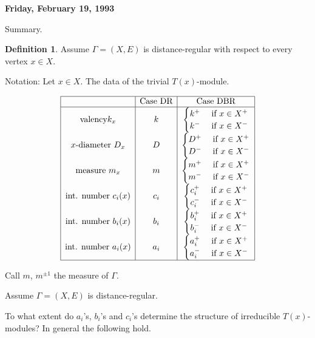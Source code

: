 \documentclass[
]{book}
\theoremstyle{definition}
\newtheorem{definition}{Definition}[chapter]
\theoremstyle{definition}
\theoremstyle{definition}
\theoremstyle{definition}
\theoremstyle{remark}
\begin{document}
\textbf{Friday, February 19, 1993}

Summary.

\begin{definition}
Assume \(\Gamma = (X, E)\) is distance-regular with respect to every vertex \(x\in X\).

Notation: Let \(x\in X\). The data of the trivial \(T(x)\)-module.

\[\begin{array}{|c|c|c|}
\hline
& \text{Case DR}  & \text{Case DBR} \\
\hline
\text{valency} k_x & k & \begin{cases} k^+ & \text{ if } x\in X^+\\
k^- & \text{ if } x\in X^-\end{cases}\\
x\text{-diameter } D_x & D & \begin{cases} D^+ & \text{ if } x\in X^+\\
D^- & \text{ if } x\in X^-\end{cases}\\
\text{measure $m_x$} & m & \begin{cases} m^+ & \text{ if } x\in X^+\\
m^- & \text{ if } x\in X^-\end{cases}\\
\text{int. number }c_i(x) & c_i & \begin{cases} c_i^+ & \text{ if } x\in X^+\\
c_i^- & \text{ if } x\in X^-\end{cases}\\ 
\text{int. number }b_i(x) & b_i & \begin{cases} b_i^+ & \text{ if } x\in X^+\\
b_i^- & \text{ if } x\in X^-\end{cases}\\ 
\text{int. number }a_i(x) & a_i & \begin{cases} a_i^+ & \text{ if } x\in X^+\\
a_i^- & \text{ if } x\in X^-\end{cases}\\ 
\hline
\end{array}\]

Call \(m\), \(m^{\pm 1}\) the measure of \(\Gamma\).
\end{definition}

Assume \(\Gamma = (X, E)\) is distance-regular.

To what extent do \(a_i\)'s, \(b_i\)'s and \(c_i\)'s determine the structure of irreducible \(T(x)\)-modules? In general the following hold.
\end{document}
